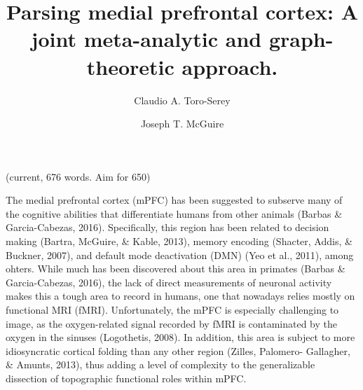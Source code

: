 \documentclass[9pt,twocolumn,twoside,]{pnas-new}
\title{Parsing medial prefrontal cortex: A joint meta-analytic and
graph-theoretic approach.}
\author[a,1,2]{Claudio A. Toro-Serey}
\author[a,1]{Joseph T. McGuire}
\affil[a]{Boston University, Department of Psychological and Brain Sciences, 64
Commonwealth Ave., Boston, 02250}
\begin{document}
\verticaladjustment{-2pt}

\maketitle
\thispagestyle{firststyle}



(current, 676 words. Aim for 650)

The medial prefrontal cortex (mPFC) has been suggested to subserve many
of the cognitive abilities that differentiate humans from other animals
(Barbas \& Garcia-Cabezas, 2016). Specifically, this region has been
related to decision making (Bartra, McGuire, \& Kable, 2013), memory
encoding (Shacter, Addis, \& Buckner, 2007), and default mode
deactivation (DMN) (Yeo et al., 2011), among ohters. While much has been
discovered about this area in primates (Barbas \& Garcia-Cabezas, 2016),
the lack of direct measurements of neuronal activity makes this a tough
area to record in humans, one that nowadays relies mostly on functional
MRI (fMRI). Unfortunately, the mPFC is especially challenging to image,
as the oxygen-related signal recorded by fMRI is contaminated by the
oxygen in the sinuses (Logothetis, 2008). In addition, this area is
subject to more idiosyncratic cortical folding than any other region
(Zilles, Palomero- Gallagher, \& Amunts, 2013), thus adding a level of
complexity to the generalizable dissection of topographic functional
roles within mPFC.
\end{document}
